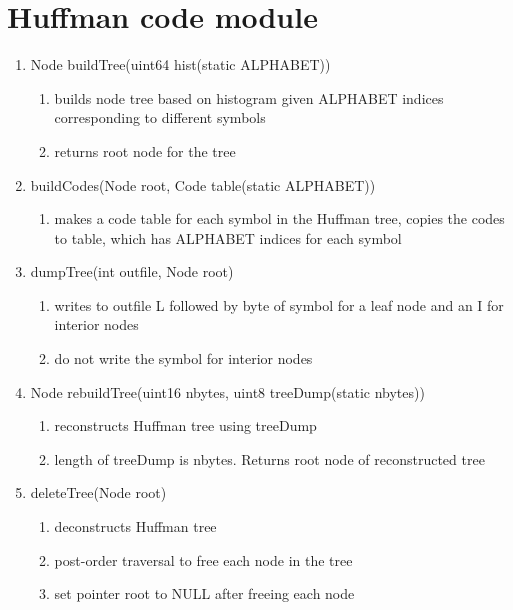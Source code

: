 \documentclass[11pt]{article}
\begin{document}
\section{Huffman code module}\label{ss:module}
\begin{enumerate}
\item Node buildTree(uint64 hist(static ALPHABET))
	\begin{enumerate}
	\item builds node tree based on histogram given ALPHABET indices corresponding to different symbols
	\item returns root node for the tree
	\end{enumerate}
\item buildCodes(Node root, Code table(static ALPHABET))
	\begin{enumerate}
	\item makes a code table for each symbol in the Huffman tree, copies the codes to table, which has ALPHABET indices for each symbol
	\end{enumerate}
\item dumpTree(int outfile, Node root)
	\begin{enumerate}
	\item writes to outfile L followed by byte of symbol for a leaf node and an I for interior nodes
	\item do not write the symbol for interior nodes
	\end{enumerate}
\item Node rebuildTree(uint16 nbytes, uint8 treeDump(static nbytes))
	\begin{enumerate}
	\item reconstructs Huffman tree using treeDump
	\item length of treeDump is nbytes. Returns root node of reconstructed tree
	\end{enumerate}
\item deleteTree(Node root)
	\begin{enumerate}
	\item deconstructs Huffman tree
	\item post-order traversal to free each node in the tree
	\item set pointer root to NULL after freeing each node
	\end{enumerate}
\end{enumerate}
\end{document}
